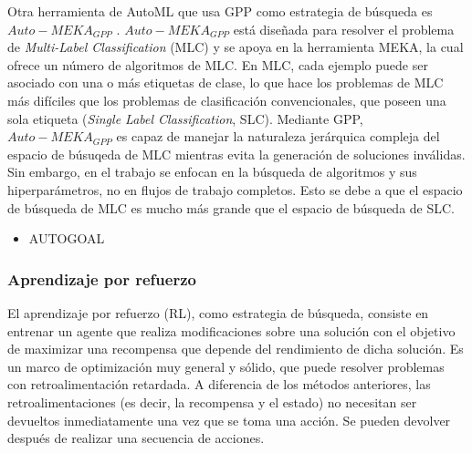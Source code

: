 Otra herramienta de AutoML que usa GPP como estrategia de búsqueda es $Auto-MEKA_{GPP}$ \cite{de2018automated}. $Auto-MEKA_{GPP}$ está diseñada para resolver el problema de \textit{Multi-Label Classification} (MLC) y se apoya en la herramienta MEKA, la cual ofrece un número de algoritmos de MLC. En MLC, cada ejemplo puede ser asociado con una o más etiquetas de clase, lo que hace los problemas de MLC más difíciles que los problemas de clasificación convencionales, que poseen una sola etiqueta (\textit{Single Label Classification}, SLC). Mediante GPP, $Auto-MEKA_{GPP}$ es capaz de manejar la naturaleza jerárquica compleja del espacio de búsuqeda de MLC mientras evita la generación de soluciones inválidas. Sin embargo, en el trabajo se enfocan en la búsqueda de algoritmos y sus hiperparámetros, no en flujos de trabajo completos. Esto se debe a que el espacio de búsqueda de MLC es mucho más grande que el espacio de búsqueda de SLC.

\begin{itemize}
	\item AUTOGOAL
\end{itemize}

\subsubsection{Aprendizaje por refuerzo}


El aprendizaje por refuerzo (RL), como estrategia de búsqueda, consiste en entrenar un agente que realiza modificaciones sobre una solución con el objetivo de maximizar una recompensa que depende del rendimiento de dicha solución. Es un marco de optimización muy general y sólido, que puede resolver problemas con retroalimentación retardada. A diferencia de los métodos anteriores, las retroalimentaciones (es decir, la recompensa y el estado) no necesitan ser devueltos inmediatamente una vez que se toma una acción. Se pueden devolver después de realizar una secuencia de acciones. 

